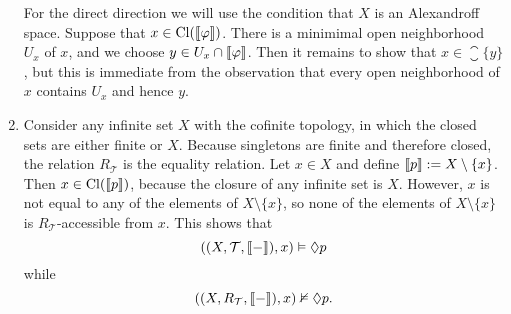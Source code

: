 \documentclass{article}
\newcommand{\topology}{{\mathcal{T}}}
\begin{document}
\begin{ex}
\begin{enumerate}
For the direct direction we will use the condition that $X$ is an Alexandroff
space. Suppose that $x\in\mathrm{Cl}(\llbracket\varphi\rrbracket)$. There is a minimimal
open neighborhood $U_x$ of $x$, and we choose $y\in U_x\cap\llbracket\varphi\rrbracket$.
Then it remains to show that $x\in\closure{\{y\}}$, but this is immediate from
the observation that every open neighborhood of $x$ contains $U_x$ and hence $y$.
\item Consider any infinite set $X$ with the cofinite topology, in which the closed
sets are either finite or $X$. Because singletons are finite and therefore
closed, the relation $R_\topology$ is the equality relation.
Let $x\in X$ and define $\llbracket p\rrbracket:=X\setminus\{x\}$. Then $x\in\mathrm{Cl}(\llbracket p\rrbracket)$,
because the closure of any infinite set is $X$. However, $x$ is not equal to any
of the elements of $X\setminus\{x\}$, so none of the elements of $X\setminus\{x\}$
is $R_\topology$-accessible from $x$. This shows that
\begin{equation*}
((X,\topology,\lsem{-}\rsem),x)\models \pos p
\end{equation*}
while
\begin{equation*}
((X,R_\topology,\lsem{-}\rsem),x)\nmodels \pos p.
\end{equation*}
\end{enumerate}
\end{ex}
\end{document}
